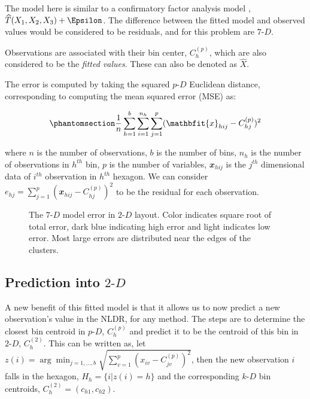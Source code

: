 \documentclass[
  12pt]{article}
\newcommand\pD{$p\text{-}D$}
\newcommand\kD{$k\text{-}D$}
\newcommand\gD{$2\text{-}D$}
\begin{document}
The model here is similar to a confirmatory factor analysis model
\citep{brown2015}, \(\widehat{T}(X_1, X_2, X_3) + \Epsilon\). The
difference between the fitted model and observed values would be
considered to be residuals, and for this problem are \(7\text{-}D\).

Observations are associated with their bin center, \(C_{h}^{(p)}\),
which are also considered to be the \emph{fitted values}. These can also
be denoted as \(\widehat{X}\).

The error is computed by taking the squared \pD{} Euclidean distance,
corresponding to computing the mean squared error (MSE) as:

\begin{equation}\phantomsection\label{eq-equation1}{\frac{1}{n}\sum_{h = 1}^{b}\sum_{i = 1}^{n_h}\sum_{j = 1}^{p} (\mathbfit{x}_{hij} - C^{(p)}_{hj})^2}\end{equation}

where \(n\) is the number of observations, \(b\) is the number of bins,
\(n_h\) is the number of observations in \(h^{th}\) bin, \(p\) is the
number of variables, \(\mathbfit{x}_{hij}\) is the \(j^{th}\)
dimensional data of \(i^{th}\) observation in \(h^{th}\) hexagon. We can
consider
\(e_{hj} = \sum_{j = 1}^{p} (\mathbfit{x}_{hij} - C^{(p)}_{hj})^2\) to
be the residual for each observation.

\begin{figure}[H]


\caption{\label{fig-p-d-error-in-2d-two-curvy}The \(7\text{-}D\) model
error in \gD{} layout. Color indicates square root of total error, dark
blue indicating high error and light indicates low error. Most large
errors are distributed near the edges of the clusters.}

\end{figure}%

\subsection{\texorpdfstring{Prediction into
\gD{}}{Prediction into }}\label{prediction-into}

A new benefit of this fitted model is that it allows us to now predict a
new observation's value in the NLDR, for any method. The steps are to
determine the closest bin centroid in \pD{}, \(C^{(p)}_{h}\) and predict
it to be the centroid of this bin in \gD{}, \(C^{(2)}_{h}\). This can be
written as, let
\(z(i) = \arg\min_{j = 1, \dots, b} \sqrt{\sum_{v=1}^{p}(x_{iv} - C^{(p)}_{jv})^2}\),
then the new observation \(i\) falls in the hexagon,
\(H_h = \{i| z(i) = h\}\) and the corresponding \kD{} bin centroids,
\(C_{h}^{(2)} = (c_{h1}, c_{h2})\).
\end{document}
